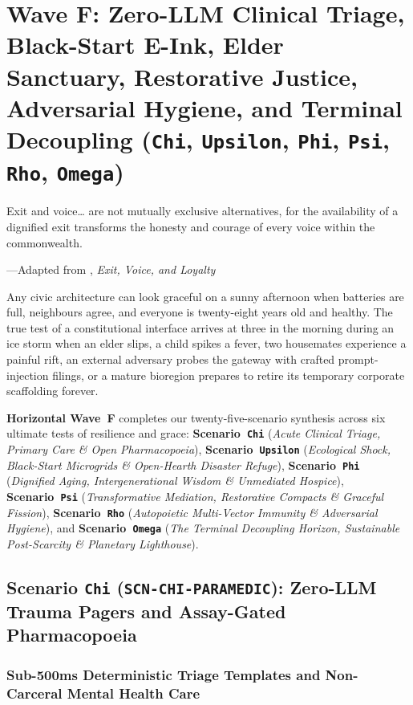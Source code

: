 \chapter{Wave F: Zero-LLM Clinical Triage, Black-Start E-Ink, Elder Sanctuary, Restorative Justice, Adversarial Hygiene, and Terminal Decoupling (\texttt{Chi}, \texttt{Upsilon}, \texttt{Phi}, \texttt{Psi}, \texttt{Rho}, \texttt{Omega})}
\label{ch:wave-f}

\epigraph{Exit and voice\ldots{} are not mutually exclusive alternatives, for the availability of a dignified exit transforms the honesty and courage of every voice within the commonwealth.}{---Adapted from \textcite{hirschman1970}, \textit{Exit, Voice, and Loyalty}}

Any civic architecture can look graceful on a sunny afternoon when batteries are full, neighbours agree, and everyone is twenty-eight years old and healthy. The true test of a constitutional interface arrives at three in the morning during an ice storm when an elder slips, a child spikes a fever, two housemates experience a painful rift, an external adversary probes the gateway with crafted prompt-injection filings, or a mature bioregion prepares to retire its temporary corporate scaffolding forever.

\textbf{Horizontal Wave~F} completes our twenty-five-scenario synthesis across six ultimate tests of resilience and grace: \textbf{Scenario~\texttt{Chi}} (\textit{Acute Clinical Triage, Primary Care \& Open Pharmacopoeia}), \textbf{Scenario~\texttt{Upsilon}} (\textit{Ecological Shock, Black-Start Microgrids \& Open-Hearth Disaster Refuge}), \textbf{Scenario~\texttt{Phi}} (\textit{Dignified Aging, Intergenerational Wisdom \& Unmediated Hospice}), \textbf{Scenario~\texttt{Psi}} (\textit{Transformative Mediation, Restorative Compacts \& Graceful Fission}), \textbf{Scenario~\texttt{Rho}} (\textit{Autopoietic Multi-Vector Immunity \& Adversarial Hygiene}), and \textbf{Scenario~\texttt{Omega}} (\textit{The Terminal Decoupling Horizon, Sustainable Post-Scarcity \& Planetary Lighthouse}).

\section{Scenario \texttt{Chi} (\texttt{SCN-CHI-PARAMEDIC}): Zero-LLM Trauma Pagers and Assay-Gated Pharmacopoeia}
\label{sec:wave-f-chi}

\subsection{Sub-500ms Deterministic Triage Templates and Non-Carceral Mental Health Care}

